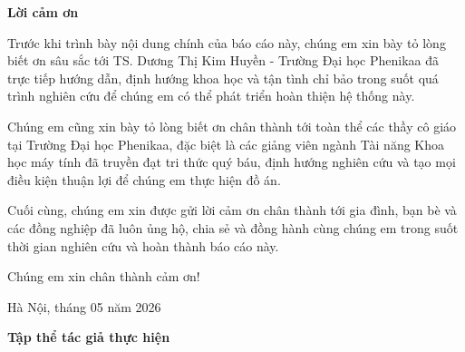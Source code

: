 
\begin{center}
    \Large{\textbf{Lời cảm ơn}}
\end{center}
\vspace{1cm}

Trước khi trình bày nội dung chính của báo cáo này, chúng em xin bày tỏ lòng biết ơn sâu sắc tới TS. Dương Thị Kim Huyền - Trường Đại học Phenikaa đã trực tiếp hướng dẫn, định hướng khoa học và tận tình chỉ bảo trong suốt quá trình nghiên cứu để chúng em có thể phát triển hoàn thiện hệ thống này.
\medskip

Chúng em cũng xin bày tỏ lòng biết ơn chân thành tới toàn thể các thầy cô giáo tại Trường Đại học Phenikaa, đặc biệt là các giảng viên ngành Tài năng Khoa học máy tính đã truyền đạt tri thức quý báu, định hướng nghiên cứu và tạo mọi điều kiện thuận lợi để chúng em thực hiện đồ án.
\medskip

Cuối cùng, chúng em xin được gửi lời cảm ơn chân thành tới gia đình, bạn bè và các đồng nghiệp đã luôn ủng hộ, chia sẻ và đồng hành cùng chúng em trong suốt thời gian nghiên cứu và hoàn thành báo cáo này.

Chúng em xin chân thành cảm ơn!
\vspace{1.5cm}
	
\hskip9.5cm Hà Nội, tháng 05 năm 2026

\vspace{1.5cm}

\hskip9.5cm{\bf Tập thể tác giả thực hiện}
\pagebreak 
